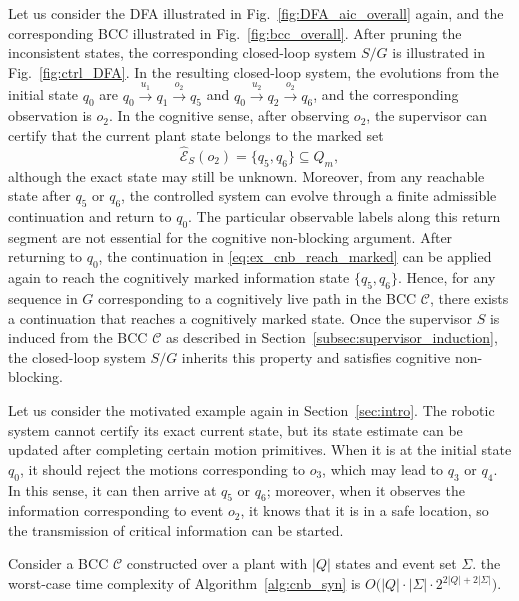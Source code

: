 \documentclass[journal,twoside,web]{ieeecolor}
\begin{document}
\begin{example}\label{ex:DFA_cnb}
    Let us consider the DFA illustrated in Fig.~\ref{fig:DFA_aic_overall} again,  and the corresponding BCC illustrated in Fig.~\ref{fig:bcc_overall}.
    After pruning the inconsistent states, the corresponding closed-loop system $S / G$ is illustrated in Fig.~\ref{fig:ctrl_DFA}.
    In the resulting closed-loop system, the evolutions from the initial state $q_0$ are $q_0 \xrightarrow{u_1} q_1 \xrightarrow{o_2} q_5$ and $q_0 \xrightarrow{u_2} q_2 \xrightarrow{o_2} q_6$, and the corresponding observation is $o_2$.
    In the cognitive sense, after observing $o_2$, the supervisor can certify that the current plant state belongs to the marked set
    \begin{equation}\label{eq:ex_cnb_reach_marked}
        \hat{\mathcal{E}}_S(o_2) = \{ q_5, q_6 \} \subseteq Q_m,
    \end{equation}
    although the exact state may still be unknown.
    Moreover, from any reachable state after $q_5$ or $q_6$, the controlled system can evolve through a finite admissible continuation and return to $q_0$.
    The particular observable labels along this return segment are not essential for the cognitive non-blocking argument.
    After returning to $q_0$, the continuation in \eqref{eq:ex_cnb_reach_marked} can be applied again to reach the cognitively marked information state $\{ q_5, q_6 \}$.
    Hence, for any sequence in $G$ corresponding to a cognitively live path in the BCC $\mathcal{C}$, there exists a continuation that reaches a cognitively marked state.
    Once the supervisor $S$ is induced from the BCC $\mathcal{C}$ as described in Section~\ref{subsec:supervisor_induction}, the closed-loop system $S/G$ inherits this property and satisfies cognitive non-blocking.
    
    Let us consider the motivated example again in Section~\ref{sec:intro}.
    The robotic system cannot certify its exact current state, but its state estimate can be updated after completing certain motion primitives.
    When it is at the initial state $q_0$, it should reject the motions corresponding to $o_3$, which may lead to $q_3$ or $q_4$.
    In this sense, it can then arrive at $q_5$ or $q_6$; moreover, when it observes the information corresponding to event $o_2$, it knows that it is in a safe location, so the transmission of critical information can be started.
\end{example}

\begin{proposition}
Consider a BCC $\mathcal{C}$ constructed over a plant with $|Q|$ states and
event set $\Sigma$.  the worst-case time complexity of Algorithm~\ref{alg:cnb_syn} is
$
    O\big(|Q|\cdot |\Sigma|\cdot 2^{2|Q|+2|\Sigma|}\big).
$
\end{proposition}
\end{document}
